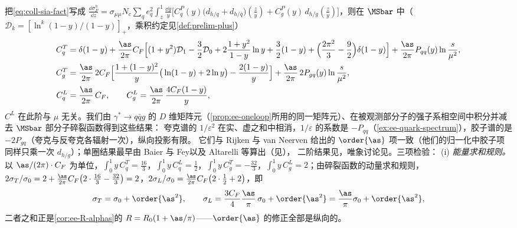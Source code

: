 \begin{remark}[系数函数与检验]\label{rem:coll-sia-nlo}
把\cref{eq:coll-sia-fact}写成 $\frac{\dd\sigma^h_P}{\dd z}=\sigma_{\mu\mu}N_c\sum_qe_q^2\int_z^1\frac{\dd y}y\big[C^P_q(y)\big(d_{h/q}+d_{h/\bar q}\big)(\tfrac zy)+C^P_g(y)\,d_{h/g}(\tfrac zy)\big]$，则在 $\MSbar$ 中（$\mathcal D_k=[\ln^k(1-y)/(1-y)]_+$，乘积约定见\cref{def:prelim-plus}）
\begin{equation}\label{eq:coll-CT}
\begin{aligned}
C^T_q&=\delta(1-y)+\frac{\as}{2\pi}C_F\Big[(1+y^2)\mathcal D_1-\frac32\mathcal D_0+2\frac{1+y^2}{1-y}\ln y+\frac32(1-y)+\Big(\frac{2\pi^2}3-\frac92\Big)\delta(1-y)\Big]+\frac{\as}{2\pi}P_{qq}(y)\ln\frac{s}{\mu^2},\\
C^T_g&=\frac{\as}{2\pi}\,2C_F\Big[\frac{1+(1-y)^2}{y}\big(\ln(1-y)+2\ln y\big)-\frac{2(1-y)}y\Big]+\frac{\as}{2\pi}\,2P_{gq}(y)\ln\frac{s}{\mu^2},\\
C^L_q&=\frac{\as}{2\pi}\,C_F,\qquad C^L_g=\frac{\as}{2\pi}\,\frac{4C_F(1-y)}y ,
\end{aligned}
\end{equation}
$C^L$ 在此阶与 $\mu$ 无关。我们由 $\gamma^*\to q\bar qg$ 的 $D$ 维矩阵元（\cref{prop:ee-oneloop}所用的同一矩阵元）、在被观测部分子的强子系相空间中积分并减去 $\MSbar$ 部分子碎裂函数得到这些结果：
夸克谱的 $1/\varepsilon^2$ 在实、虚之和中相消，$1/\varepsilon$ 的系数是 $-P_{qq}$（\cref{ex:ee-quark-spectrum}），胶子谱的是 $-2P_{gq}$（夸克与反夸克各辐射一次），纵向投影有限。%
它们与 Rijken 与 van Neerven 给出的 $\order{\as}$ 项一致\cite[附录~A，式~(A3)、(A10)、(A11)]{RijkenVanNeerven1997}（他们的归一化中胶子项同样只乘一次 $d_{h/g}$）；单圈结果最早由 Baier 与 Fey\cite{BaierFey1979}以及 Altarelli 等\cite{AltarelliEtAl1979}算出（见\cite[第~12.11~节]{Collins2011}），
二阶结果见\cite{RijkenVanNeerven1996,RijkenVanNeerven1997}，唯象讨论见\cite{NasonWebber1994}。三项检验：
(i) \emph{能量求和规则。}以 $\as/(2\pi)\cdot C_F$ 为单位，$\int_0^1y\,C^T_q=\frac{16}3$，$\int_0^1y\,C^L_q=\frac12$，$\int_0^1y\,C^T_g=-\frac{32}3$，$\int_0^1y\,C^L_g=2$；由碎裂函数的动量求和规则，
$2\sigma_T/\sigma_0=2+\frac{\as}{2\pi}C_F\big(2\cdot\frac{16}3-\frac{32}3\big)=2$，$2\sigma_L/\sigma_0=\frac{\as}{2\pi}C_F\big(2\cdot\frac12+2\big)$，即
\begin{equation}\label{eq:coll-sigmaL}
\sigma_T=\sigma_0+\order{\as^2},\qquad \sigma_L=\frac{3C_F}4\frac{\as}\pi\,\sigma_0+\order{\as^2}=\frac{\as}\pi\sigma_0+\order{\as^2},
\end{equation}
二者之和正是\cref{cor:ee-R-alphas}的 $R=R_0(1+\as/\pi)$——$\order{\as}$ 的修正全部是纵向的。

\end{remark}

